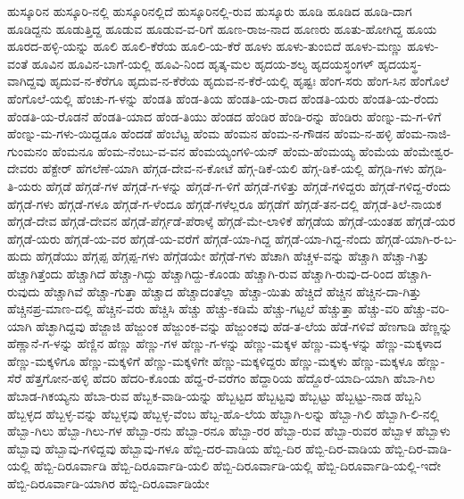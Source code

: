 ಹುಸ್ಕೂರಿನ
ಹುಸ್ಕೂರಿ-ನಲ್ಲಿ
ಹುಸ್ಕೂರಿನಲ್ಲಿದೆ
ಹುಸ್ಕೂರಿನಲ್ಲಿ-ರುವ
ಹುಸ್ಕೂರು
ಹೂಡಿ
ಹೂಡಿದ
ಹೂಡಿ-ದಾಗ
ಹೂಡಿದ್ದನು
ಹೂಡುತ್ತಿದ್ದ
ಹೂಡುವ
ಹೂಡುವ-ವ-ರಿಗೆ
ಹೂಣ-ರಾಜ-ನಾದ
ಹೂಣರು
ಹೂತು-ಹೋಗಿದ್ದ
ಹೂಯ
ಹೂರದ-ಹಳ್ಳಿ-ಯನ್ನು
ಹೂಲಿ
ಹೂಲಿ-ಕೆರೆಯ
ಹೂಲಿ-ಯ-ಕೆರೆ
ಹೂಳು
ಹೂಳು-ತುಂಬಿದೆ
ಹೂಳು-ಮಣ್ಣು
ಹೂಳು-ವಂತೆ
ಹೂವಿನ
ಹೂವಿನ-ಬಾಗೆ-ಯಲ್ಲಿ
ಹೂವಿ-ನಿಂದ
ಹೃತ್ಕ-ಮಲ
ಹೃದಯ-ಶಲ್ಯ
ಹೃದಯಸ್ಥಂಗಳ್
ಹೃದಯಸ್ಥ-ವಾಗಿದ್ದವು
ಹೃದುವ-ನ-ಕೆರೆಗೂ
ಹೃದುವ-ನ-ಕೆರೆಯ
ಹೃದುವ-ನ-ಕೆರೆ-ಯಲ್ಲಿ
ಹೃಷ್ಟಃ
ಹೆಂಗ-ಸರು
ಹೆಂಗ-ಸಿನ
ಹೆಂಗೊಲೆ
ಹೆಂಗೊಲೆ-ಯಲ್ಲಿ
ಹೆಂಚು-ಗ-ಳನ್ನು
ಹೆಂಡತಿ
ಹೆಂಡ-ತಿಯ
ಹೆಂಡತಿ-ಯ-ರಾದ
ಹೆಂಡತಿ-ಯರು
ಹೆಂಡತಿ-ಯ-ರೆಂದು
ಹೆಂಡತಿ-ಯ-ರೊಡನೆ
ಹೆಂಡತಿ-ಯಾದ
ಹೆಂಡ-ತಿಯು
ಹೆಂಡದ
ಹೆಂಡಿರ
ಹೆಂಡಿ-ರನ್ನು
ಹೆಂಡಿರು
ಹೆಂಣ್ನು-ಮ-ಗ-ಳಿಗೆ
ಹೆಂಣ್ನು-ಮ-ಗಳು-ಯಿದ್ದಡೂ
ಹೆಂದಡೆ
ಹೆಂಬೆಟ್ಟ
ಹೆಂಮ
ಹೆಂಮನ
ಹೆಂಮ-ನ-ಗೌಡನ
ಹೆಂಮ-ನ-ಹಳ್ಳಿ
ಹೆಂಮ-ನಾಜಿ-ಗುಂಮನಂ
ಹೆಂಮನೂ
ಹೆಂಮ-ನೆಂಬು-ವ-ವನ
ಹೆಂಮಯ್ಯಂಗಳಿ-ಯನ್
ಹೆಂಮ-ಹೆಂಮಯ್ಯ
ಹೆಂಮೆಯ
ಹೆಂಮೇಶ್ವರ-ದೇವರು
ಹೆಕ್ಟೇರ್
ಹೆಗಲೆಣೆ-ಯಾಗಿ
ಹೆಗ್ಗಡ-ದೇವ-ನ-ಕೋಟೆ
ಹೆಗ್ಗ-ಡಿಕೆ-ಯಲಿ
ಹೆಗ್ಗ-ಡಿಕೆ-ಯಲ್ಲಿ
ಹೆಗ್ಗಡಿ-ಗಳು
ಹೆಗ್ಗಡಿ-ತಿ-ಯರು
ಹೆಗ್ಗಡೆ
ಹೆಗ್ಗಡೆ-ಗಳ
ಹೆಗ್ಗಡೆ-ಗ-ಳನ್ನು
ಹೆಗ್ಗಡೆ-ಗ-ಳಿಗೆ
ಹೆಗ್ಗಡೆ-ಗಳಿತ್ತು
ಹೆಗ್ಗಡೆ-ಗಳಿದ್ದರು
ಹೆಗ್ಗಡೆ-ಗಳಿದ್ದ-ರೆಂದು
ಹೆಗ್ಗಡೆ-ಗಳು
ಹೆಗ್ಗಡೆ-ಗಳೂ
ಹೆಗ್ಗಡೆ-ಗ-ಳೆಂದೂ
ಹೆಗ್ಗಡೆ-ಗಳೆಲ್ಲರೂ
ಹೆಗ್ಗಡೆಗೆ
ಹೆಗ್ಗಡೆ-ತನ-ದಲ್ಲಿ
ಹೆಗ್ಗಡೆ-ತಿಲೆ-ನಾಯಕ
ಹೆಗ್ಗಡೆ-ದೇವ
ಹೆಗ್ಗಡೆ-ದೇವನ
ಹೆಗ್ಗಡೆ-ಪೆರ್ಗ್ಗಡೆ-ಪೆರಾಳ್ಕೆ
ಹೆಗ್ಗಡೆ-ಮೇ-ಲಾಳಿಕೆ
ಹೆಗ್ಗಡೆಯ
ಹೆಗ್ಗಡೆ-ಯಂತಹ
ಹೆಗ್ಗಡೆ-ಯರ
ಹೆಗ್ಗಡೆ-ಯರು
ಹೆಗ್ಗಡೆ-ಯ-ವರ
ಹೆಗ್ಗಡೆ-ಯ-ವರೆಗೆ
ಹೆಗ್ಗಡೆ-ಯಾ-ಗಿದ್ದ
ಹೆಗ್ಗಡೆ-ಯಾ-ಗಿದ್ದ-ನೆಂದು
ಹೆಗ್ಗಡೆ-ಯಾಗಿ-ರ-ಬ-ಹುದು
ಹೆಗ್ಗಡೆಯು
ಹೆಗ್ಗಪ್ಪ
ಹೆಗ್ಗಪ್ಪ-ಗಳು
ಹೆಗ್ಗೆಡಯೇ
ಹೆಗ್ಗೆಡೆ-ಗಳು
ಹೆಚಾಗಿ
ಹೆಚ್ಚಳ-ವನ್ನು
ಹೆಚ್ಚಾಗಿ
ಹೆಚ್ಚಾ-ಗಿತ್ತು
ಹೆಚ್ಚಾಗಿತ್ತೆಂದು
ಹೆಚ್ಚಾಗಿದೆ
ಹೆಚ್ಚಾ-ಗಿದ್ದು
ಹೆಚ್ಚಾಗಿದ್ದು-ಕೊಂಡು
ಹೆಚ್ಚಾಗಿ-ರುವ
ಹೆಚ್ಚಾಗಿ-ರುವು-ದ-ರಿಂದ
ಹೆಚ್ಚಾಗಿ-ರುವುದು
ಹೆಚ್ಚಾಗಿವೆ
ಹೆಚ್ಚಾ-ಗುತ್ತಾ
ಹೆಚ್ಚಾದ
ಹೆಚ್ಚಾದಂತೆಲ್ಲಾ
ಹೆಚ್ಚಾ-ಯಿತು
ಹೆಚ್ಚಿದೆ
ಹೆಚ್ಚಿನ
ಹೆಚ್ಚಿನ-ದಾ-ಗಿತ್ತು
ಹೆಚ್ಚಿನಪ್ರ-ಮಾಣ-ದಲ್ಲಿ
ಹೆಚ್ಚಿನ-ವರು
ಹೆಚ್ಚಿಸಿ
ಹೆಚ್ಚು
ಹೆಚ್ಚು-ಕಡಿಮೆ
ಹೆಚ್ಚು-ಗಟ್ಟಲೆ
ಹೆಚ್ಚುತ್ತಾ
ಹೆಚ್ಚು-ವರಿ
ಹೆಚ್ಚು-ವರಿ-ಯಾಗಿ
ಹೆಚ್ಛಾಗಿದ್ದವು
ಹೆಜ್ಜಾಜಿ
ಹೆಜ್ಜುಂಕ
ಹೆಜ್ಜುಂಕ-ವನ್ನು
ಹೆಜ್ಜುಂಕವು
ಹೆಡ-ತ-ಲೆಯ
ಹೆಡೆ-ಗಳಿವೆ
ಹೆಣಗಾಡಿ
ಹೆಣ್ಣನ್ನು
ಹೆಣ್ಣಾನೆ-ಗ-ಳನ್ನು
ಹೆಣ್ಣಿನ
ಹೆಣ್ಣು
ಹೆಣ್ಣು-ಗಳ
ಹೆಣ್ಣು-ಗ-ಳನ್ನು
ಹೆಣ್ಣು-ಮಕ್ಕಳ
ಹೆಣ್ಣು-ಮಕ್ಕ-ಳನ್ನು
ಹೆಣ್ಣು-ಮಕ್ಕಳಾದ
ಹೆಣ್ಣು-ಮಕ್ಕಳಿಗೂ
ಹೆಣ್ಣು-ಮಕ್ಕಳಿಗೆ
ಹೆಣ್ಣು-ಮಕ್ಕಳಿಗೇ
ಹೆಣ್ಣು-ಮಕ್ಕಳಿದ್ದರು
ಹೆಣ್ಣು-ಮಕ್ಕಳು
ಹೆಣ್ಣು-ಮಕ್ಕಳೂ
ಹೆಣ್ಣು-ಸೆರೆ
ಹೆತ್ತಗೋನ-ಹಳ್ಳಿ
ಹೆದರಿ
ಹೆದರಿ-ಕೊಂಡು
ಹೆದ್ದ-ರೆ-ವರೆಗಂ
ಹೆದ್ದಾರಿಯ
ಹೆದ್ದೊರೆ-ಯಾದಿ-ಯಾಗಿ
ಹೆಬಾ-ಗಿಲ
ಹೆಬಾಡ-ಗಿಕಯ್ಯನು
ಹೆಬಾ-ರುವ
ಹೆಬ್ಬಕ-ವಾಡಿ-ಯನ್ನು
ಹೆಬ್ಬಟ್ಟದ
ಹೆಬ್ಬಟ್ಟವು
ಹೆಬ್ಬಟ್ಟು
ಹೆಬ್ಬಟ್ಟು-ನಾಡ
ಹೆಬ್ಬನಿ
ಹೆಬ್ಬಳ್ಳದ
ಹೆಬ್ಬಳ್ಳ-ವನ್ನು
ಹೆಬ್ಬಳ್ಳವು
ಹೆಬ್ಬಳ್ಳ-ವೆಂಬ
ಹೆಬ್ಬ-ಹೊ-ಲೆಯ
ಹೆಬ್ಬಾಗಿ-ಲನ್ನು
ಹೆಬ್ಬಾ-ಗಿಲಿ
ಹೆಬ್ಬಾಗಿ-ಲಿ-ನಲ್ಲಿ
ಹೆಬ್ಬಾ-ಗಿಲು
ಹೆಬ್ಬಾ-ಗಿಲು-ಗಳ
ಹೆಬ್ಬಾ-ರನು
ಹೆಬ್ಬಾ-ರನೂ
ಹೆಬ್ಬಾ-ರರ
ಹೆಬ್ಬಾ-ರುವ
ಹೆಬ್ಬಾ-ರುವರ
ಹೆಬ್ಬಾಳ
ಹೆಬ್ಬಾಳು
ಹೆಬ್ಬಾವು
ಹೆಬ್ಬಾವು-ಗಳಿದ್ದವು
ಹೆಬ್ಬಾವು-ಗಳೂ
ಹೆಬ್ಬಿ-ದರ-ವಾಡಿಯ
ಹೆಬ್ಬಿ-ದಿರ
ಹೆಬ್ಬಿ-ದಿರ-ವಾಡಿಯ
ಹೆಬ್ಬಿ-ದಿರ-ವಾಡಿ-ಯಲ್ಲಿ
ಹೆಬ್ಬಿ-ದಿರೂರ್ವಾಡಿ
ಹೆಬ್ಬಿ-ದಿರೂರ್ವಾಡಿ-ಯಲಿ
ಹೆಬ್ಬಿ-ದಿರೂರ್ವಾಡಿ-ಯಲ್ಲಿ
ಹೆಬ್ಬಿ-ದಿರೂರ್ವಾಡಿ-ಯಲ್ಲಿ-ಇದೇ
ಹೆಬ್ಬಿ-ದಿರೂರ್ವಾಡಿ-ಯಾಗಿರ
ಹೆಬ್ಬಿ-ದಿರೂರ್ವಾಡಿಯೇ
